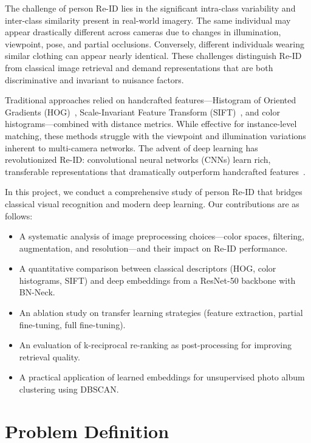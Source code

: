 \documentclass[final]{cvpr}
\begin{document}
The challenge of person Re-ID lies in the significant intra-class variability and inter-class similarity present in real-world imagery.
The same individual may appear drastically different across cameras due to changes in illumination, viewpoint, pose, and partial occlusions.
Conversely, different individuals wearing similar clothing can appear nearly identical.
These challenges distinguish Re-ID from classical image retrieval and demand representations that are both discriminative and invariant to nuisance factors.

Traditional approaches relied on handcrafted features---Histogram of Oriented Gradients (HOG)~\cite{dalal2005hog}, Scale-Invariant Feature Transform (SIFT)~\cite{lowe2004sift}, and color histograms---combined with distance metrics.
While effective for instance-level matching, these methods struggle with the viewpoint and illumination variations inherent to multi-camera networks.
The advent of deep learning has revolutionized Re-ID: convolutional neural networks (CNNs) learn rich, transferable representations that dramatically outperform handcrafted features~\cite{he2016deep,luo2019bag}.

In this project, we conduct a comprehensive study of person Re-ID that bridges classical visual recognition and modern deep learning.
Our contributions are as follows:
\begin{itemize}
    \item A systematic analysis of image preprocessing choices---color spaces, filtering, augmentation, and resolution---and their impact on Re-ID performance.
    \item A quantitative comparison between classical descriptors (HOG, color histograms, SIFT) and deep embeddings from a ResNet-50 backbone with BN-Neck.
    \item An ablation study on transfer learning strategies (feature extraction, partial fine-tuning, full fine-tuning).
    \item An evaluation of k-reciprocal re-ranking as post-processing for improving retrieval quality.
    \item A practical application of learned embeddings for unsupervised photo album clustering using DBSCAN.
\end{itemize}

\section{Problem Definition}
\end{document}

